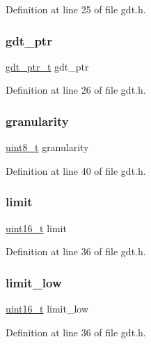 Definition at line 25 of file gdt.\+h.

\mbox{\label{a00071_ab0888c07dfb9352ef76d05e63464cf0b_ab0888c07dfb9352ef76d05e63464cf0b}} 
\subsubsection{\texorpdfstring{gdt\+\_\+ptr}{gdt\_ptr}}
{\footnotesize\ttfamily \hyperlink{a00071_a3bf3fa6f397bda8399e1afb6283b66ca_a3bf3fa6f397bda8399e1afb6283b66ca}{gdt\+\_\+ptr\+\_\+t} gdt\+\_\+ptr}



Definition at line 26 of file gdt.\+h.

\mbox{\label{a00071_acfea365f69e71368a2db03333d4afd6f_acfea365f69e71368a2db03333d4afd6f}} 
\subsubsection{\texorpdfstring{granularity}{granularity}}
{\footnotesize\ttfamily \hyperlink{a00104_aba7bc1797add20fe3efdf37ced1182c5_aba7bc1797add20fe3efdf37ced1182c5}{uint8\+\_\+t} granularity}



Definition at line 40 of file gdt.\+h.

\mbox{\label{a00071_ab28e82ae69032cb4ad3ec3a0be3d7129_ab28e82ae69032cb4ad3ec3a0be3d7129}} 
\subsubsection{\texorpdfstring{limit}{limit}}
{\footnotesize\ttfamily \hyperlink{a00104_a273cf69d639a59973b6019625df33e30_a273cf69d639a59973b6019625df33e30}{uint16\+\_\+t} limit}



Definition at line 36 of file gdt.\+h.

\mbox{\label{a00071_aa7ae5b5a918e00776ff07fb1c58a348d_aa7ae5b5a918e00776ff07fb1c58a348d}} 
\subsubsection{\texorpdfstring{limit\+\_\+low}{limit\_low}}
{\footnotesize\ttfamily \hyperlink{a00104_a273cf69d639a59973b6019625df33e30_a273cf69d639a59973b6019625df33e30}{uint16\+\_\+t} limit\+\_\+low}



Definition at line 36 of file gdt.\+h.

